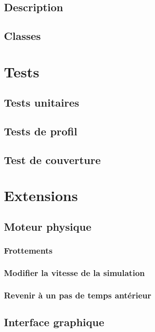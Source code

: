 \documentclass{report}
\begin{document}
\section{Description}

\section{Classes}

\chapter{Tests}

\section{Tests unitaires}

\section{Tests de profil}

\section{Test de couverture}

\chapter{Extensions}

\section{Moteur physique}

\subsection{Frottements}

\subsection{Modifier la vitesse de la simulation}

\subsection{Revenir à un pas de temps antérieur}

\section{Interface graphique}
\end{document}
